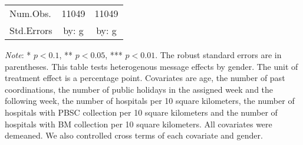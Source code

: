 \documentclass[12pt, a4paper]{article}
\begin{document}
\begin{table}[H]
\begin{threeparttable}
\begin{tabular}[t]{>{\raggedright\arraybackslash}p{30em}cc}
Num.Obs. & \num{11049} & \num{11049}\\
Std.Errors & by: g & by: g\\
\bottomrule
\end{tabular}
\begin{tablenotes}
\item \emph{Note}: * $p < 0.1$, ** $p < 0.05$, *** $p < 0.01$. The robust standard errors are in parentheses. This table tests heterogenous message effects by gender. The unit of treatment effect is a percentage point. Covariates are age, the number of past coordinations, the number of public holidays in the assigned week and the following week, the number of hospitals per 10 square kilometers, the number of hospitals with PBSC collection per 10 square kilometers and the number of hospitals with BM collection per 10 square kilometers. All covariates were demeaned. We also controlled cross terms of each covariate and gender.
\end{tablenotes}
\end{threeparttable}
\end{table}
\end{document}
